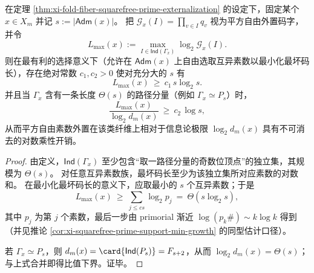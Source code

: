 \begin{corollary}[平方自由素数外置的最坏码长下界与对数乘性胀量]\label{cor:xi-squarefree-externalization-log-overhead}
在定理 \ref{thm:xi-fold-fiber-squarefree-prime-externalization} 的设定下，固定某个 \(x\in X_m\) 并记 \(s:=|\mathsf{Adm}(x)|\)。
把 \(\mathcal G_x(I)=\prod_{v\in I}q_v\) 视为平方自由外置码字，并令
\[
L_{\max}(x):=\max_{I\in\mathsf{Ind}(\Gamma_x)}\log_2 \mathcal G_x(I).
\]
则在最有利的选择意义下（允许在 \(\mathsf{Adm}(x)\) 上自由选取互异素数以最小化最坏码长），存在绝对常数 \(c_1,c_2>0\) 使对充分大的 \(s\) 有
\[
L_{\max}(x)\ \ge\ c_1\, s\log_2 s.
\]
并且当 \(\Gamma_x\) 含有一条长度 \(\Theta(s)\) 的路径分量（例如 \(\Gamma_x\simeq P_s\)）时，
\[
\frac{L_{\max}(x)}{\log_2 d_m(x)}\ \ge\ c_2\,\log s,
\]
从而平方自由素数外置在该类纤维上相对于信息论极限 \(\log_2 d_m(x)\) 具有不可消去的对数乘性开销。
\end{corollary}
\begin{proof}
由定义，\(\mathsf{Ind}(\Gamma_x)\) 至少包含“取一路径分量的奇数位顶点”的独立集，其规模为 \(\Theta(s)\)。
对任意互异素数族，最坏码长至少为该独立集所对应素数的对数和。
在最小化最坏码长的意义下，应取最小的 \(s\) 个互异素数；于是
\[
L_{\max}(x)\ \ge\ \sum_{j\le c s}\log_2 p_j\ =\ \Theta(s\log_2 s),
\]
其中 \(p_j\) 为第 \(j\) 个素数，最后一步由 primorial 渐近 \(\log(p_k\#)\sim k\log k\) 得到（并见推论 \ref{cor:xi-squarefree-prime-support-min-growth} 的同型估计口径）。
\par
若 \(\Gamma_x\simeq P_s\)，则 \(d_m(x)=\card{\mathsf{Ind}(P_s)}=F_{s+2}\)，从而 \(\log_2 d_m(x)=\Theta(s)\)；
与上式合并即得比值下界。证毕。
\end{proof}

